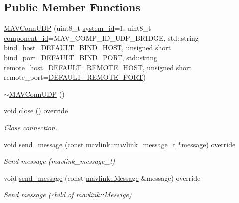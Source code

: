 \subsection*{Public Member Functions}
\begin{DoxyCompactItemize}
\item 
\mbox{\hyperlink{group__mavconn_ga22deee111faac2fde80a0affc6c29245}{M\+A\+V\+Conn\+U\+DP}} (uint8\+\_\+t \mbox{\hyperlink{setHome_8cpp_a83150acb88d810ae6864b4c125324ed6}{system\+\_\+id}}=1, uint8\+\_\+t \mbox{\hyperlink{setHome_8cpp_adc84285d5da2c4fa9721d0a32d5e41a7}{component\+\_\+id}}=M\+A\+V\+\_\+\+C\+O\+M\+P\+\_\+\+I\+D\+\_\+\+U\+D\+P\+\_\+\+B\+R\+I\+D\+GE, std\+::string bind\+\_\+host=\mbox{\hyperlink{group__mavconn_ga62467db7651e86bb5428c4288356f813}{D\+E\+F\+A\+U\+L\+T\+\_\+\+B\+I\+N\+D\+\_\+\+H\+O\+ST}}, unsigned short bind\+\_\+port=\mbox{\hyperlink{group__mavconn_ga330f03ed06a3e027ec7be74426dc646b}{D\+E\+F\+A\+U\+L\+T\+\_\+\+B\+I\+N\+D\+\_\+\+P\+O\+RT}}, std\+::string remote\+\_\+host=\mbox{\hyperlink{group__mavconn_ga7a03f4b69e2791a742717516b6421466}{D\+E\+F\+A\+U\+L\+T\+\_\+\+R\+E\+M\+O\+T\+E\+\_\+\+H\+O\+ST}}, unsigned short remote\+\_\+port=\mbox{\hyperlink{group__mavconn_ga25daeb4235691fdf52da1551bf93bc88}{D\+E\+F\+A\+U\+L\+T\+\_\+\+R\+E\+M\+O\+T\+E\+\_\+\+P\+O\+RT}})
\item 
\mbox{\hyperlink{group__mavconn_gad9edacd1a8f5993cdcfb188f83e3ca49}{$\sim$\+M\+A\+V\+Conn\+U\+DP}} ()
\item 
void \mbox{\hyperlink{group__mavconn_ga78a057400db4bf2240b00e29d4251dfe}{close}} () override
\begin{DoxyCompactList}\small\item\em Close connection. \end{DoxyCompactList}\item 
void \mbox{\hyperlink{group__mavconn_gae33a3895701a613a72d7fc1ab9bbb3d8}{send\+\_\+message}} (const \mbox{\hyperlink{include__v0_89_2mavlink__types_8h_a63b963764c09dc72f4910c1521e325b9}{mavlink\+::mavlink\+\_\+message\+\_\+t}} $\ast$message) override
\begin{DoxyCompactList}\small\item\em Send message (mavlink\+\_\+message\+\_\+t) \end{DoxyCompactList}\item 
void \mbox{\hyperlink{group__mavconn_gae5e3ad4657f7aa9e970d0cb7a6bc367d}{send\+\_\+message}} (const \mbox{\hyperlink{structmavlink_1_1Message}{mavlink\+::\+Message}} \&message) override
\begin{DoxyCompactList}\small\item\em Send message (child of \mbox{\hyperlink{structmavlink_1_1Message}{mavlink\+::\+Message}}) \end{DoxyCompactList}\item 

\end{DoxyCompactItemize}
